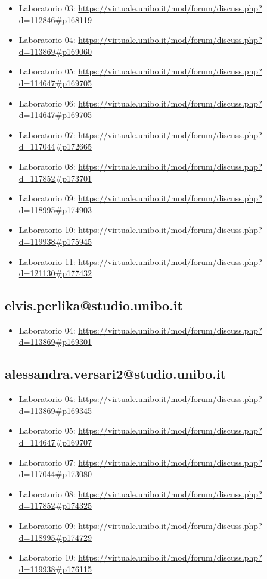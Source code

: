 \documentclass[a4paper,12pt]{report}
\begin{document}
\begin{itemize}
	\item Laboratorio 03: \url{https://virtuale.unibo.it/mod/forum/discuss.php?d=112846#p168119}
	\item Laboratorio 04: \url{https://virtuale.unibo.it/mod/forum/discuss.php?d=113869#p169060}
	\item Laboratorio 05: \url{https://virtuale.unibo.it/mod/forum/discuss.php?d=114647#p169705}
	\item Laboratorio 06: \url{https://virtuale.unibo.it/mod/forum/discuss.php?d=114647#p169705}
	\item Laboratorio 07: \url{https://virtuale.unibo.it/mod/forum/discuss.php?d=117044#p172665}
	\item Laboratorio 08: \url{https://virtuale.unibo.it/mod/forum/discuss.php?d=117852#p173701}
	\item Laboratorio 09: \url{https://virtuale.unibo.it/mod/forum/discuss.php?d=118995#p174903}
	\item Laboratorio 10: \url{https://virtuale.unibo.it/mod/forum/discuss.php?d=119938#p175945}
	\item Laboratorio 11: \url{https://virtuale.unibo.it/mod/forum/discuss.php?d=121130#p177432}
\end{itemize}


\subsection{elvis.perlika@studio.unibo.it}

\begin{itemize}
	\item Laboratorio 04: \url{https://virtuale.unibo.it/mod/forum/discuss.php?d=113869#p169301}
\end{itemize}


\subsection{alessandra.versari2@studio.unibo.it}
\begin{itemize}
	\item Laboratorio 04: \url{https://virtuale.unibo.it/mod/forum/discuss.php?d=113869#p169345}
	\item Laboratorio 05: \url{https://virtuale.unibo.it/mod/forum/discuss.php?d=114647#p169707}
	\item Laboratorio 07: \url{https://virtuale.unibo.it/mod/forum/discuss.php?d=117044#p173080}
	\item Laboratorio 08: \url{https://virtuale.unibo.it/mod/forum/discuss.php?d=117852#p174325}
	\item Laboratorio 09: \url{https://virtuale.unibo.it/mod/forum/discuss.php?d=118995#p174729}
	\item Laboratorio 10: \url{https://virtuale.unibo.it/mod/forum/discuss.php?d=119938#p176115}
\end{itemize}
\end{document}
